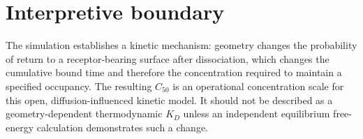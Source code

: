 \documentclass[11pt]{article}
\begin{document}
\section{Interpretive boundary}

The simulation establishes a kinetic mechanism: geometry changes the
probability of return to a receptor-bearing surface after dissociation, which
changes the cumulative bound time and therefore the concentration required to
maintain a specified occupancy.  The resulting $C_{50}$ is an operational
concentration scale for this open, diffusion-influenced kinetic model.  It
should not be described as a geometry-dependent thermodynamic $K_D$ unless an
independent equilibrium free-energy calculation demonstrates such a change.



\end{document}
